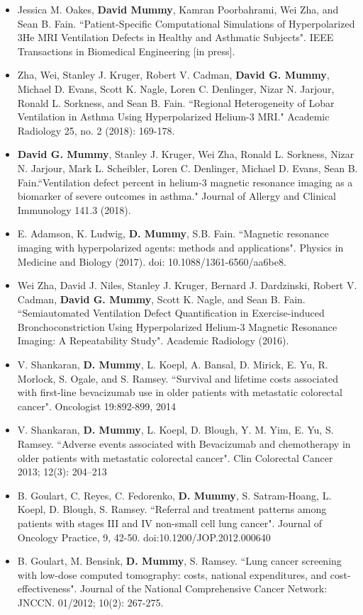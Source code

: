 \documentclass[10pt]{article}
\newenvironment{innerlist}[1][\enskip\textbullet]%
        {\begin{itemize}[#1,leftmargin=*,parsep=0pt,itemsep=0pt,topsep=0pt,partopsep=0pt]}
        {\end{itemize}}
\begin{document}
\begin{innerlist}
\item Jessica M. Oakes, {\bf David Mummy}, Kamran Poorbahrami, Wei Zha, and Sean B. Fain. ``Patient-Specific Computational Simulations of Hyperpolarized 3He MRI Ventilation Defects in Healthy and Asthmatic Subjects". IEEE Transactions in Biomedical Engineering [in press].
\item Zha, Wei, Stanley J. Kruger, Robert V. Cadman, {\bf David G. Mummy}, Michael D. Evans, Scott K. Nagle, Loren C. Denlinger, Nizar N. Jarjour, Ronald L. Sorkness, and Sean B. Fain. ``Regional Heterogeneity of Lobar Ventilation in Asthma Using Hyperpolarized Helium-3 MRI." Academic Radiology 25, no. 2 (2018): 169-178.
\item {\bf David G. Mummy}, Stanley J. Kruger, Wei Zha, Ronald L. Sorkness, Nizar N. Jarjour, Mark L. Scheibler, Loren C. Denlinger, Michael D. Evans, Sean B. Fain.``Ventilation defect percent in helium-3 magnetic resonance imaging as a biomarker of severe outcomes in asthma." Journal of Allergy and Clinical Immunology 141.3 (2018). 
\item E. Adamson, K. Ludwig, {\bf D. Mummy}, S.B. Fain. ``Magnetic resonance imaging with hyperpolarized agents: methods and applications". Physics in Medicine and Biology (2017). doi: 10.1088/1361-6560/aa6be8.
    \item Wei Zha, David J. Niles, Stanley J. Kruger, Bernard J. Dardzinski, Robert V. Cadman, {\bf David G. Mummy}, Scott K. Nagle, and Sean B. Fain. ``Semiautomated Ventilation Defect Quantification in Exercise-induced Bronchoconstriction Using Hyperpolarized Helium-3 Magnetic Resonance Imaging: A Repeatability Study". Academic Radiology (2016).
    \item V. Shankaran, {\bf D. Mummy}, L. Koepl, A. Bansal, D. Mirick, E. Yu, R. Morlock, S. Ogale, and S. Ramsey. ``Survival and lifetime costs associated with first-line bevacizumab use in older patients with metastatic colorectal cancer". Oncologist 19:892-899, 2014
    \item V. Shankaran, {\bf D. Mummy}, L. Koepl, D. Blough, Y. M. Yim, E. Yu, S. Ramsey. ``Adverse events associated with Bevacizumab and chemotherapy in older patients with metastatic colorectal cancer". Clin Colorectal Cancer 2013; 12(3): 204–213
	\item B. Goulart, C. Reyes, C. Fedorenko, {\bf D. Mummy}, S. Satram-Hoang, L. Koepl, D. Blough, S. Ramsey. ``Referral and treatment patterns among patients with stages III and IV non-small cell lung cancer". Journal of Oncology Practice, 9, 42-50. doi:10.1200/JOP.2012.000640
	\item B. Goulart, M. Bensink, {\bf D. Mummy}, S. Ramsey. ``Lung cancer screening with low-dose computed tomography: costs, national expenditures, and cost-effectiveness". Journal of the National Comprehensive Cancer Network: JNCCN. 01/2012; 10(2): 267-275.
\end{innerlist}
\end{document}
